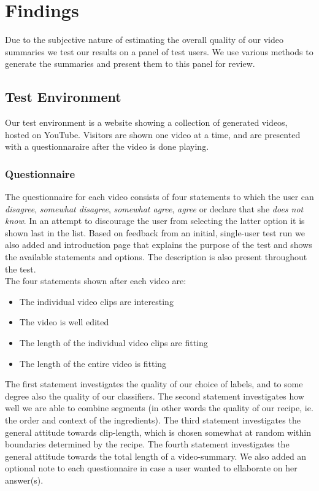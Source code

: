 %
\section{Findings}
%
Due to the subjective nature of estimating the overall quality of our video summaries we test our results on a panel of test users. We use various methods to generate the summaries and present them to this panel for review.
%
\subsection{Test Environment}
%
Our test environment is a website showing a collection of generated videos, hosted on YouTube. Visitors are shown one video at a time, and are presented with a questionnaraire after the video is done playing.
%
\subsubsection{Questionnaire}
%
%
The questionnaire for each video consists of four statements to which the user can \textit{disagree}, \textit{somewhat disagree}, \textit{somewhat agree}, \textit{agree} or declare that she \textit{does not know}. In an attempt to discourage the user from selecting the latter option it is shown last in the list. Based on feedback from an initial, single-user test run we also added and introduction page that explains the purpose of the test and shows the available statements and options. The description is also present throughout the test.\\
%
The four statements shown after each video are:
%
\begin{itemize}
\item The individual video clips are interesting
\item The video is well edited
\item The length of the individual video clips are fitting
\item The length of the entire video is fitting
\end{itemize}
%
The first statement investigates the quality of our choice of labels, and to some degree also the quality of our classifiers. The second statement investigates how well we are able to combine segments (in other words the quality of our recipe, ie. the order and context of the ingredients). The third statement investigates the general attitude towards clip-length, which is chosen somewhat at random within boundaries determined by the recipe. The fourth statement investigates the general attitude towards the total length of a video-summary. We also added an optional note to each questionnaire in case a user wanted to ellaborate on her answer(s).
%
